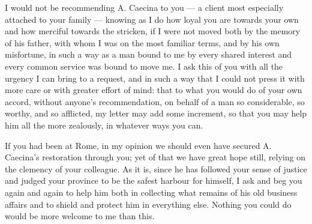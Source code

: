 

 I would not be recommending A. Caecina to you --- a client most especially attached to your family --- knowing as I do how loyal you are towards your own and how merciful towards the stricken, if I were not moved both by the memory of his father, with whom I was on the most familiar terms, and by his own misfortune, in such a way as a man bound to me by every shared interest and every common service was bound to move me. I ask this of you with all the urgency I can bring to a request, and in such a way that I could not press it with more care or with greater effort of mind: that to what you would do of your own accord, without anyone's recommendation, on behalf of a man so considerable, so worthy, and so afflicted, my letter may add some increment, so that you may help him all the more zealously, in whatever ways you can.

 If you had been at Rome, in my opinion we should even have secured A. Caecina's restoration through you; yet of that we have great hope still, relying on the clemency of your colleague. As it is, since he has followed your sense of justice and judged your province to be the safest harbour for himself, I ask and beg you again and again to help him both in collecting what remains of his old business affairs and to shield and protect him in everything else. Nothing you could do would be more welcome to me than this.
